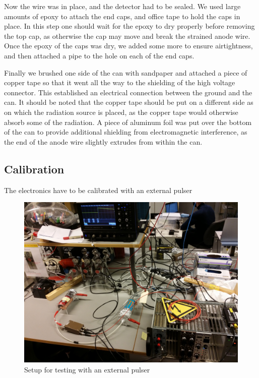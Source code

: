 \documentclass[a4paper]{article}
\begin{document}
Now the wire was in place, and the detector had to be sealed.
We used large amounts of epoxy to attach the end caps, and office tape to hold the caps in place.
In this step one should wait for the epoxy to dry properly before removing the top cap, as otherwise the cap may move and break the strained anode wire.
Once the epoxy of the caps was dry, we added some more to ensure airtightness, and then attached a pipe to the hole on each of the end caps.

Finally we brushed one side of the can with sandpaper and attached a piece of copper tape so that it went all the way to the shielding of the high voltage connector.
This established an electrical connection between the ground and the can.
It should be noted that the copper tape should be put on a different side as on which the radiation source is placed, as the copper tape would otherwise absorb some of the radiation.
A piece of aluminum foil was put over the bottom of the can to provide additional shielding from electromagnetic interference, as the end of the anode wire slightly extrudes from within the can.


\FloatBarrier
\subsection{Calibration}
The electronics have to be calibrated with an external pulser

\begin{figure}[ht!]
\centering
\includegraphics[width=\textwidth]{fig/IMG_20201130_135000.jpg}
\caption{Setup for testing with an external pulser}
\end{figure}
\end{document}
